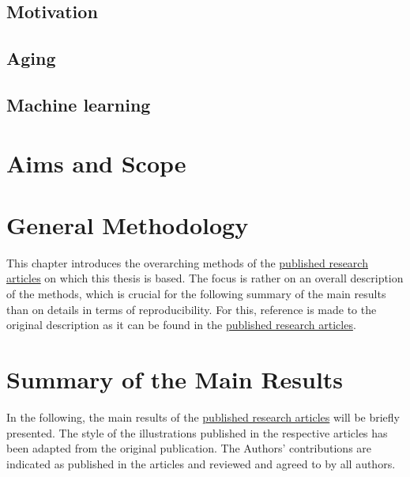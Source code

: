 \documentclass[oneside]{book}
\begin{document}
        \section{Motivation}
        \label{motivation}
        
        
    
        \section{Aging}
        \label{theory:aging}
            
        
        \section{Machine learning}
        \label{theory:ml}
         

    \chapter{Aims and Scope}
    \label{chap:aims_scope}
    

    \chapter{General Methodology}
    \label{chap:methods}
    This chapter introduces the overarching methods of the \hyperref[pub:papers]{published research articles} on which this thesis is based. The focus is rather on an overall description of the methods, which is crucial for the following summary of the main results than on details in terms of reproducibility. For this, reference is made to the original description as it can be found in the \hyperref[pub:papers]{published research articles}.
    
    
    \chapter{Summary of the Main Results}
    \label{chap:results}
    In the following, the main results of the \hyperref[pub:papers]{published research articles} will be briefly presented. The style of the illustrations published in the respective articles has been adapted from the original publication. The Authors' contributions are indicated as published in the articles and reviewed and agreed to by all authors.
    
\end{document}
